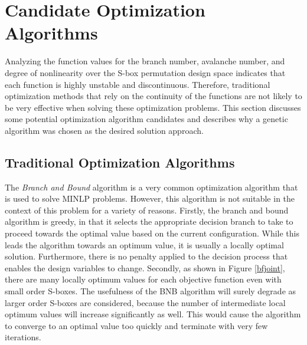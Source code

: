 \documentclass[11pt]{article}
\begin{document}
\section{Candidate Optimization Algorithms}

Analyzing the function values for the branch number, avalanche number, and degree of nonlinearity over the S-box permutation design space indicates that each function is highly unstable and discontinuous. Therefore, traditional optimization methods that rely on the continuity of the functions are not likely to be very effective when solving these optimization problems. This section discusses some potential optimization algorithm candidates and describes why a genetic algorithm was chosen as the desired solution approach.

\subsection{Traditional Optimization Algorithms}

The \emph{Branch and Bound} algorithm is a very common optimization algorithm that is used to solve MINLP problems. However, this algorithm is not suitable in the context of this problem for a variety of reasons. Firstly, the branch and bound algorithm is greedy, in that it selects the appropriate decision branch to take to proceed towards the optimal value based on the current configuration. While this leads the algorithm towards an optimum value, it is usually a locally optimal solution. Furthermore, there is no penalty applied to the decision process that enables the design variables to change. Secondly, as shown in Figure \ref{bfjoint}, there are many locally optimum values for each objective function even with small order S-boxes. The usefulness of the BNB algorithm will surely degrade as larger order S-boxes are considered, because the number of intermediate local optimum values will increase significantly as well. This would cause the algorithm to converge to an optimal value too quickly and terminate with very few iterations. 

\end{document}
